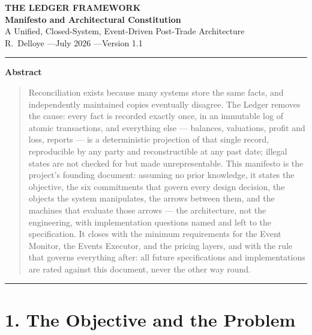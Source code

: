 \documentclass[11pt,a4paper]{article}
\begin{document}
\begin{center}
  {\LARGE\bfseries THE LEDGER FRAMEWORK}\\[0.9em]
  {\large\bfseries Manifesto and Architectural Constitution}\\[0.6em]
  {\normalsize A Unified, Closed-System, Event-Driven Post-Trade Architecture}\\[1.4em]
  R.~Delloye \quad---\quad July 2026 \quad---\quad Version 1.1
\end{center}

\vspace{0.6em}
\begin{center}\rule{0.35\linewidth}{0.4pt}\end{center}
\vspace{0.6em}

\begin{center}\textbf{Abstract}\end{center}
\begin{quote}
Reconciliation exists because many systems store the same facts, and
independently maintained copies eventually disagree. The Ledger removes
the cause: every fact is recorded exactly once, in an immutable log of
atomic transactions, and everything else --- balances, valuations,
profit and loss, reports --- is a deterministic projection of that
single record, reproducible by any party and reconstructible at any past
date; illegal states are not checked for but made unrepresentable. This
manifesto is the project's founding document: assuming no prior
knowledge, it states the objective, the six commitments that govern
every design decision, the objects the system manipulates, the arrows
between them, and the machines that evaluate those arrows --- the
architecture, not the engineering, with implementation questions named
and left to the specification. It closes with the minimum requirements
for the Event Monitor, the Events Executor, and the pricing layers, and
with the rule that governs everything after: all future specifications
and implementations are rated against this document, never the other way
round.
\end{quote}

\vspace{0.6em}
\begin{center}\rule{0.35\linewidth}{0.4pt}\end{center}
\vspace{0.6em}

\hypertarget{the-objective-and-the-problem}{%
\section{1. The Objective and the
Problem}\label{the-objective-and-the-problem}}
\end{document}
